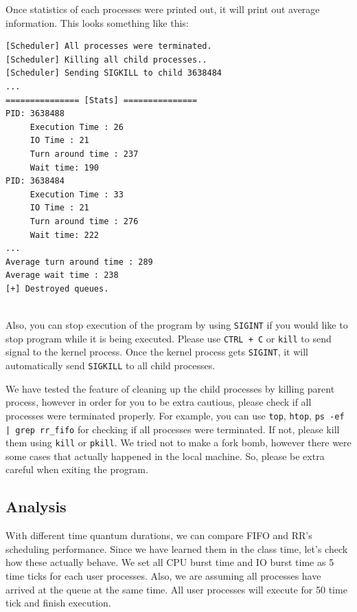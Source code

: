 \documentclass{homework}
\begin{document}
Once statistics of each processes were printed out, it will print out average information. This looks something like this:
\\
\begin{center}
\begin{code}
\begin{verbatim}
[Scheduler] All processes were terminated.
[Scheduler] Killing all child processes..
[Scheduler] Sending SIGKILL to child 3638484
...
=============== [Stats] ===============
PID: 3638488
     Execution Time : 26
     IO Time : 21
     Turn around time : 237
     Wait time: 190
PID: 3638484
     Execution Time : 33
     IO Time : 21
     Turn around time : 276
     Wait time: 222
...
Average turn around time : 289
Average wait time : 238
[+] Destroyed queues.
\end{verbatim}
\end{code}
\end{center}
\\
\pagebreak
Also, you can stop execution of the program by using \texttt{SIGINT} if you would like to stop program while it is being executed. Please use \texttt{CTRL + C} or \texttt{kill} to send signal to the kernel process. Once the kernel process gets \texttt{SIGINT}, it will automatically send \texttt{SIGKILL} to all child processes. 

We have tested the feature of cleaning up the child processes by killing parent process, however in order for you to be extra cautious, please check if all processes were terminated properly. For example, you can use \texttt{top}, \texttt{htop}, \texttt{ps -ef | grep rr_fifo} for checking if all processes were terminated. If not, please kill them using \texttt{kill} or \texttt{pkill}. We tried not to make a fork bomb, however there were some cases that actually happened in the local machine. So, please be extra careful when exiting the program.

\subsection{Analysis}
\label{sec:rrconclusion}

With different time quantum durations, we can compare FIFO and RR's scheduling performance. Since we have learned them in the class time, let's check how these actually behave. We set all CPU burst time and IO burst time as 5 time ticks for each user processes. Also, we are assuming all processes have arrived at the queue at the same time. All user processes will execute for 50 time tick and finish execution.
\end{document}
